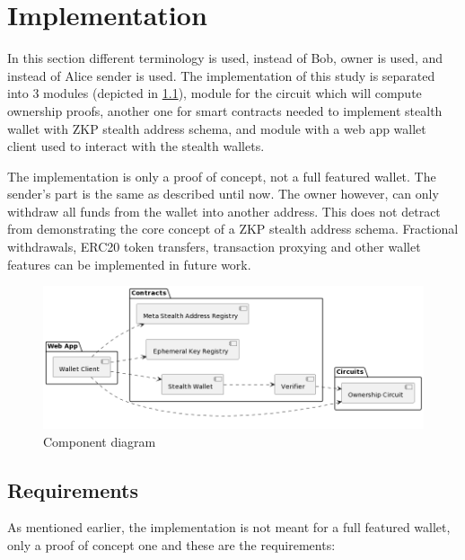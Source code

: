 \chapter{Implementation}

In this section different terminology is used, instead of Bob, owner is used,
and instead of Alice sender is used. The implementation of this study is
separated into 3 modules (depicted in \ref{fig:component-diagram}), module for the
circuit which will compute ownership proofs, another one for smart contracts
needed to implement stealth wallet with ZKP stealth address schema, and
module with a web app wallet client used to interact with the stealth wallets.

The implementation is only a proof of concept, not a full featured wallet.
The sender's part is the same as described until now. The owner however,
can only withdraw all funds from the wallet into another address. This does
not detract from demonstrating the core concept of a ZKP stealth address schema.
Fractional withdrawals, ERC20 token transfers, transaction proxying and other wallet
features can be implemented in future work.

\begin{figure}[h!]
    \centering
    \includegraphics[width=\textwidth]{assets/images/component-diagram.png}
    \caption{Component diagram}
    \label{fig:component-diagram}
    \vspace{0.5cm}
\end{figure}

\section{Requirements}

As mentioned earlier, the implementation is not meant for a full featured wallet,
only a proof of concept one and these are the requirements:

